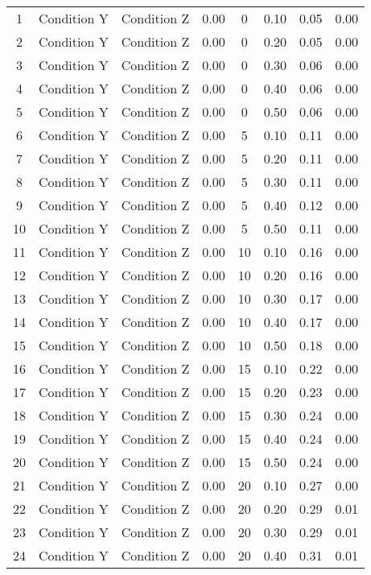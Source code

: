 \begin{landscape}
\begin{longtable}{cc cc cc cc}
 1 & Condition Y & Condition Z & 0.00 &   0 & 0.10 & 0.05 & 0.00 \\ 
  2 & Condition Y & Condition Z & 0.00 &   0 & 0.20 & 0.05 & 0.00 \\ 
  3 & Condition Y & Condition Z & 0.00 &   0 & 0.30 & 0.06 & 0.00 \\ 
  4 & Condition Y & Condition Z & 0.00 &   0 & 0.40 & 0.06 & 0.00 \\ 
  5 & Condition Y & Condition Z & 0.00 &   0 & 0.50 & 0.06 & 0.00 \\ 
  6 & Condition Y & Condition Z & 0.00 &   5 & 0.10 & 0.11 & 0.00 \\ 
  7 & Condition Y & Condition Z & 0.00 &   5 & 0.20 & 0.11 & 0.00 \\ 
  8 & Condition Y & Condition Z & 0.00 &   5 & 0.30 & 0.11 & 0.00 \\ 
  9 & Condition Y & Condition Z & 0.00 &   5 & 0.40 & 0.12 & 0.00 \\ 
  10 & Condition Y & Condition Z & 0.00 &   5 & 0.50 & 0.11 & 0.00 \\ 
  11 & Condition Y & Condition Z & 0.00 &  10 & 0.10 & 0.16 & 0.00 \\ 
  12 & Condition Y & Condition Z & 0.00 &  10 & 0.20 & 0.16 & 0.00 \\ 
  13 & Condition Y & Condition Z & 0.00 &  10 & 0.30 & 0.17 & 0.00 \\ 
  14 & Condition Y & Condition Z & 0.00 &  10 & 0.40 & 0.17 & 0.00 \\ 
  15 & Condition Y & Condition Z & 0.00 &  10 & 0.50 & 0.18 & 0.00 \\ 
  16 & Condition Y & Condition Z & 0.00 &  15 & 0.10 & 0.22 & 0.00 \\ 
  17 & Condition Y & Condition Z & 0.00 &  15 & 0.20 & 0.23 & 0.00 \\ 
  18 & Condition Y & Condition Z & 0.00 &  15 & 0.30 & 0.24 & 0.00 \\ 
  19 & Condition Y & Condition Z & 0.00 &  15 & 0.40 & 0.24 & 0.00 \\ 
  20 & Condition Y & Condition Z & 0.00 &  15 & 0.50 & 0.24 & 0.00 \\ 
  21 & Condition Y & Condition Z & 0.00 &  20 & 0.10 & 0.27 & 0.00 \\ 
  22 & Condition Y & Condition Z & 0.00 &  20 & 0.20 & 0.29 & 0.01 \\ 
  23 & Condition Y & Condition Z & 0.00 &  20 & 0.30 & 0.29 & 0.01 \\ 
  24 & Condition Y & Condition Z & 0.00 &  20 & 0.40 & 0.31 & 0.01 \\ 

\end{longtable}
\end{landscape}
